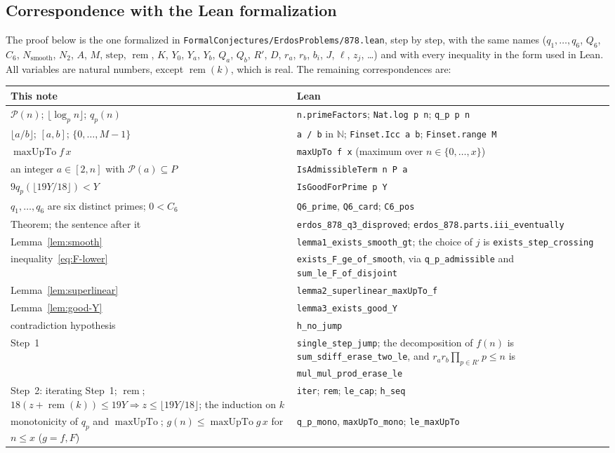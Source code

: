 \documentclass[11pt,a4paper]{amsart}
\newcommand{\maxUpTo}{\operatorname{maxUpTo}}
\newcommand{\rem}{\operatorname{rem}}
\newcommand{\step}{\mathrm{step}}
\newcommand{\Nsmooth}{N_{\mathrm{smooth}}}
\begin{document}
\subsection*{Correspondence with the Lean formalization}
The proof below is the one formalized in \nolinkurl{FormalConjectures/ErdosProblems/878.lean}, step by step, with the same names ($q_1, \dots, q_6$, $Q_6$, $C_6$, $\Nsmooth$, $N_2$, $A$, $M$, $\step$, $\rem$, $K$, $Y_0$, $Y_a$, $Y_b$, $Q_a$, $Q_b$, $R'$, $D$, $r_a$, $r_b$, $b_i$, $J$, $\ell$, $z_j$, \dots) and with every inequality in the form used in Lean. All variables are natural numbers, except $\rem(k)$, which is real. The remaining correspondences are:
\begingroup
\small
\begin{longtable}{@{}>{\raggedright\arraybackslash}p{}>{\raggedright\arraybackslash}p{}@{}}
\hline
This note & Lean \\
\hline
\endhead
$\mathcal{P}(n)$; $\lfloor \log_p n \rfloor$; $q_p(n)$ & \texttt{n.primeFactors}; \texttt{Nat.log p n}; \texttt{q\_p p n} \\
$\lfloor a / b \rfloor$; $[a, b]$; $\{0, \dots, M - 1\}$ & \texttt{a / b} in $\mathbb{N}$; \texttt{Finset.Icc a b}; \texttt{Finset.range M} \\
$\maxUpTo f\, x$ & \texttt{maxUpTo f x} (maximum over $n \in \{0, \dots, x\}$) \\
an integer $a \in [2, n]$ with $\mathcal{P}(a) \subseteq P$ & \texttt{IsAdmissibleTerm n P a} \\
$9 q_p(\lfloor 19 Y / 18 \rfloor) < Y$ & \texttt{IsGoodForPrime p Y} \\
$q_1, \dots, q_6$ are six distinct primes; $0 < C_6$ & \texttt{Q6\_prime}, \texttt{Q6\_card}; \texttt{C6\_pos} \\
Theorem; the sentence after it & \texttt{erdos\_878\_q3\_disproved}; \texttt{erdos\_878.parts.iii\_eventually} \\
Lemma~\ref{lem:smooth} & \texttt{lemma1\_exists\_smooth\_gt}; the choice of $j$ is \texttt{exists\_step\_crossing} \\
inequality~\eqref{eq:F-lower} & \texttt{exists\_F\_ge\_of\_smooth}, via \texttt{q\_p\_admissible} and \texttt{sum\_le\_F\_of\_disjoint} \\
Lemma~\ref{lem:superlinear} & \texttt{lemma2\_superlinear\_maxUpTo\_f} \\
Lemma~\ref{lem:good-Y} & \texttt{lemma3\_exists\_good\_Y} \\
contradiction hypothesis & \texttt{h\_no\_jump} \\
Step~1 & \texttt{single\_step\_jump}; the decomposition of $f(n)$ is \texttt{sum\_sdiff\_erase\_two\_le}, and $r_a r_b \prod_{p \in R'} p \le n$ is \texttt{mul\_mul\_prod\_erase\_le} \\
Step~2: iterating Step~1; $\rem$; $18(z + \rem(k)) \le 19 Y \Rightarrow z \le \lfloor 19 Y / 18 \rfloor$; the induction on $k$ & \texttt{iter}; \texttt{rem}; \texttt{le\_cap}; \texttt{h\_seq} \\
monotonicity of $q_p$ and $\maxUpTo$; $g(n) \le \maxUpTo g\, x$ for $n \le x$ ($g = f, F$) & \texttt{q\_p\_mono}, \texttt{maxUpTo\_mono}; \texttt{le\_maxUpTo} \\
\hline
\end{longtable}
\end{document}
